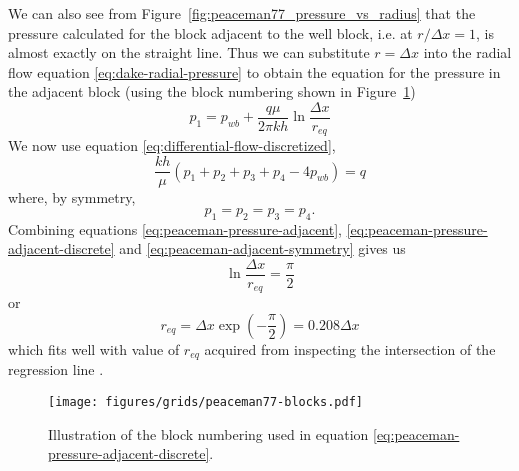 We can also see from Figure~\ref{fig:peaceman77_pressure_vs_radius} that the pressure calculated for the block adjacent to the well block, i.e. at $r/\Delta x=1$, is almost exactly on the straight line. Thus we can substitute $r=\Delta x$ into the radial flow equation \eqref{eq:dake-radial-pressure} to obtain the equation for the pressure in the adjacent block (using the block numbering shown in Figure~\ref{fig:peaceman-block-numbering})
\begin{equation}
    \label{eq:peaceman-pressure-adjacent}
    p_1 = p_{wb} + \frac{q\mu}{2\pi kh} \ln{\frac{\Delta x}{r_{eq}}}
\end{equation}
We now use equation \eqref{eq:differential-flow-discretized},
\begin{equation}
    \label{eq:peaceman-pressure-adjacent-discrete}
    \frac{kh}{\mu} \left( p_1 + p_2 + p_3 + p_4 -4p_{wb}  \right) = q
\end{equation}
where, by symmetry,
\begin{equation}
    \label{eq:peaceman-adjacent-symmetry}
    p_1=p_2=p_3=p_4.
\end{equation}
Combining equations \eqref{eq:peaceman-pressure-adjacent}, \eqref{eq:peaceman-pressure-adjacent-discrete} and \eqref{eq:peaceman-adjacent-symmetry} gives us
\begin{equation}
    \ln{\frac{\Delta x}{r_{eq}}} = \frac{\pi}{2}
\end{equation}
or
\begin{equation}
    r_{eq} = \Delta x \exp{\left( -\frac{\pi}{2} \right)} = 0.208 \Delta x
\end{equation}
which fits well with value of $r_{eq}$ acquired from inspecting the intersection of the regression line \cite{Peaceman1978Interpretation}.

\begin{figure}[htb]
    \centering
    \texttt{[image: figures/grids/peaceman77-blocks.pdf]}
    \caption{Illustration of the block numbering used in equation \eqref{eq:peaceman-pressure-adjacent-discrete}.}
    \label{fig:peaceman-block-numbering}
\end{figure}








